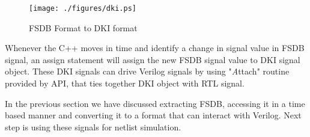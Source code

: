 \begin{figure}[h]
\centering
\texttt{[image: ./figures/dki.ps]}
\caption{FSDB Format to DKI format}
\label{fig:dki.eps}
\end{figure}



Whenever the C++ moves in time and identify a change in signal value in FSDB signal, an assign statement will assign the new FSDB signal value to DKI signal object.  These DKI signals can drive Verilog signals by using "{\emph Attach}" routine provided by API, that ties together DKI object with RTL signal. 

In the previous section we have discussed extracting FSDB, accessing it in a time based manner and converting it to a format that can interact with Verilog. Next step is using these signals for netlist simulation.

